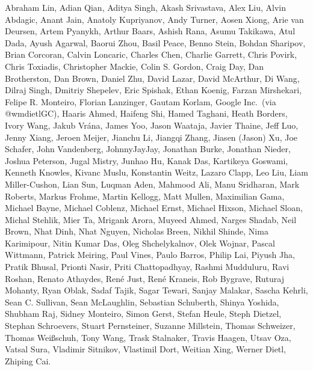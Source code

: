 Abraham Lin,
Adian Qian,
Aditya Singh,
Akash Srivastava,
Alex Liu,
Alvin Abdagic,
Anant Jain,
Anatoly Kupriyanov,
Andy Turner,
Aosen Xiong,
Arie van Deursen,
Artem Pyanykh,
Arthur Baars,
Ashish Rana,
Asumu Takikawa,
Atul Dada,
Ayush Agarwal,
Baorui Zhou,
Basil Peace,
Benno Stein,
Bohdan Sharipov,
Brian Corcoran,
Calvin Loncaric,
Charles Chen,
Charlie Garrett,
Chris Povirk,
Chris Toxiadis,
Christopher Mackie,
Colin S. Gordon,
Craig Day,
Dan Brotherston,
Dan Brown,
Daniel Zhu,
David Lazar,
David McArthur,
Di Wang,
Dilraj Singh,
Dmitriy Shepelev,
Eric Spishak,
Ethan Koenig,
Farzan Mirshekari,
Felipe R. Monteiro,
Florian Lanzinger,
Gautam Korlam,
Google Inc.\ (via @wmdietlGC),
Haaris Ahmed,
Haifeng Shi,
Hamed Taghani,
Heath Borders,
Ivory Wang,
Jakub Vr\'ana,
James Yoo,
Jason Waataja,
Javier Thaine,
Jeff Luo,
Jenny Xiang,
Jeroen Meijer,
Jianchu Li,
Jiangqi Zhang,
Jiasen (Jason) Xu,
Joe Schafer,
John Vandenberg,
JohnnyJayJay,
Jonathan Burke,
Jonathan Nieder,
Joshua Peterson,
Jugal Mistry,
Junhao Hu,
Kanak Das,
Kartikeya Goswami,
Kenneth Knowles,
Kivanc Muslu,
Konstantin Weitz,
Lazaro Clapp,
Leo Liu,
Liam Miller-Cushon,
Lian Sun,
Luqman Aden,
Mahmood Ali,
Manu Sridharan,
Mark Roberts,
Markus Frohme,
Martin Kellogg,
Matt Mullen,
Maximilian Gama,
Michael Bayne,
Michael Coblenz,
Michael Ernst,
Michael Hixson,
Michael Sloan,
Michal Stehlik,
Mier Ta,
Mrigank Arora,
Muyeed Ahmed,
Narges Shadab,
Neil Brown,
Nhat Dinh,
Nhat Nguyen,
Nicholas Breen,
Nikhil Shinde,
Nima Karimipour,
Nitin Kumar Das,
Oleg Shchelykalnov,
Olek Wojnar,
Pascal Wittmann,
Patrick Meiring,
Paul Vines,
Paulo Barros,
Philip Lai,
Piyush Jha,
Pratik Bhusal,
Prionti Nasir,
Priti Chattopadhyay,
Rashmi Mudduluru,
Ravi Roshan,
Renato Athaydes,
Ren\'e Just,
Ren\'e Kraneis,
Rob Bygrave,
Ruturaj Mohanty,
Ryan Oblak,
Sadaf Tajik,
Sagar Tewari,
Sanjay Malakar,
Sascha Kehrli,
Sean C. Sullivan,
Sean McLaughlin,
Sebastian Schuberth,
Shinya Yoshida,
Shubham Raj,
Sidney Monteiro,
Simon Gerst,
Stefan Heule,
Steph Dietzel,
Stephan Schroevers,
Stuart Pernsteiner,
Suzanne Millstein,
Thomas Schweizer,
Thomas Wei\ss schuh,
Tony Wang,
Trask Stalnaker,
Travis Haagen,
Utsav Oza,
Vatsal Sura,
Vladimir Sitnikov,
Vlastimil Dort,
Weitian Xing,
Werner Dietl,
Zhiping Cai.
